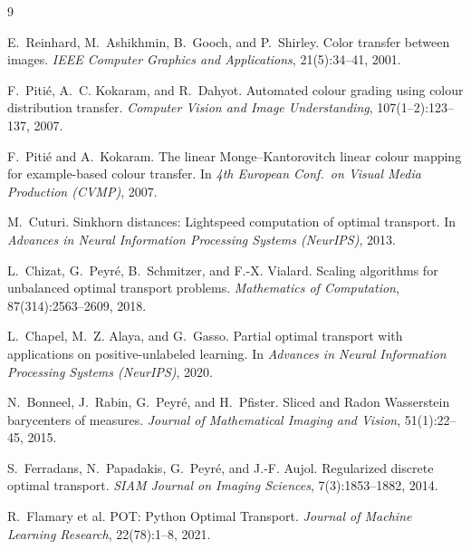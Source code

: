 \documentclass[11pt,a4paper]{article}
\begin{document}
\begin{thebibliography}{9}

E.~Reinhard, M.~Ashikhmin, B.~Gooch, and P.~Shirley.
\newblock Color transfer between images.
\newblock \emph{IEEE Computer Graphics and Applications}, 21(5):34--41, 2001.

F.~Piti\'e, A.~C. Kokaram, and R.~Dahyot.
\newblock Automated colour grading using colour distribution transfer.
\newblock \emph{Computer Vision and Image Understanding}, 107(1--2):123--137, 2007.

F.~Piti\'e and A.~Kokaram.
\newblock The linear Monge--Kantorovitch linear colour mapping for
  example-based colour transfer.
\newblock In \emph{4th European Conf.\ on Visual Media Production (CVMP)}, 2007.

M.~Cuturi.
\newblock Sinkhorn distances: Lightspeed computation of optimal transport.
\newblock In \emph{Advances in Neural Information Processing Systems (NeurIPS)}, 2013.

L.~Chizat, G.~Peyr\'e, B.~Schmitzer, and F.-X. Vialard.
\newblock Scaling algorithms for unbalanced optimal transport problems.
\newblock \emph{Mathematics of Computation}, 87(314):2563--2609, 2018.

L.~Chapel, M.~Z. Alaya, and G.~Gasso.
\newblock Partial optimal transport with applications on positive-unlabeled
  learning.
\newblock In \emph{Advances in Neural Information Processing Systems (NeurIPS)}, 2020.

N.~Bonneel, J.~Rabin, G.~Peyr\'e, and H.~Pfister.
\newblock Sliced and Radon Wasserstein barycenters of measures.
\newblock \emph{Journal of Mathematical Imaging and Vision}, 51(1):22--45, 2015.

S.~Ferradans, N.~Papadakis, G.~Peyr\'e, and J.-F. Aujol.
\newblock Regularized discrete optimal transport.
\newblock \emph{SIAM Journal on Imaging Sciences}, 7(3):1853--1882, 2014.

R.~Flamary et al.
\newblock POT: Python Optimal Transport.
\newblock \emph{Journal of Machine Learning Research}, 22(78):1--8, 2021.

\end{thebibliography}
\end{document}
